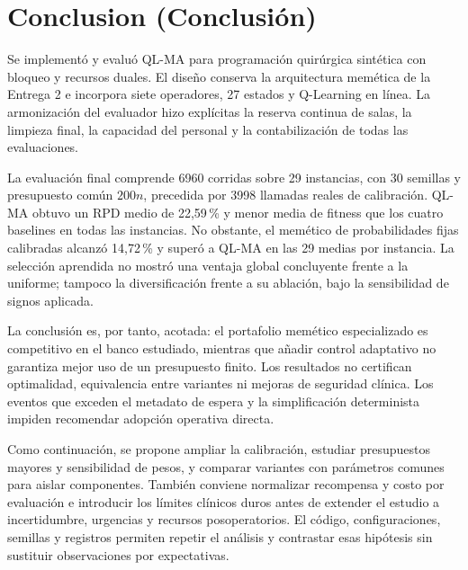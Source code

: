 \documentclass[11pt,a4paper]{article}
\begin{document}
\clearpage
{}
\section{Conclusion (Conclusión)}
\label{sec:conclusion}
Se implementó y evaluó QL-MA para programación quirúrgica sintética con bloqueo y recursos duales. El diseño conserva la arquitectura memética de la Entrega 2 e incorpora siete operadores, 27 estados y Q-Learning en línea. La armonización del evaluador hizo explícitas la reserva continua de salas, la limpieza final, la capacidad del personal y la contabilización de todas las evaluaciones.

La evaluación final comprende 6960 corridas sobre 29 instancias, con 30 semillas y presupuesto común $200n$, precedida por 3998 llamadas reales de calibración. QL-MA obtuvo un RPD medio de 22,59\,\% y menor media de fitness que los cuatro baselines en todas las instancias. No obstante, el memético de probabilidades fijas calibradas alcanzó 14,72\,\% y superó a QL-MA en las 29 medias por instancia. La selección aprendida no mostró una ventaja global concluyente frente a la uniforme; tampoco la diversificación frente a su ablación, bajo la sensibilidad de signos aplicada.

La conclusión es, por tanto, acotada: el portafolio memético especializado es competitivo en el banco estudiado, mientras que añadir control adaptativo no garantiza mejor uso de un presupuesto finito. Los resultados no certifican optimalidad, equivalencia entre variantes ni mejoras de seguridad clínica. Los eventos que exceden el metadato de espera y la simplificación determinista impiden recomendar adopción operativa directa.

Como continuación, se propone ampliar la calibración, estudiar presupuestos mayores y sensibilidad de pesos, y comparar variantes con parámetros comunes para aislar componentes. También conviene normalizar recompensa y costo por evaluación e introducir los límites clínicos duros antes de extender el estudio a incertidumbre, urgencias y recursos posoperatorios. El código, configuraciones, semillas y registros permiten repetir el análisis y contrastar esas hipótesis sin sustituir observaciones por expectativas.
\label{sec:conclusion-fin}
\end{document}
